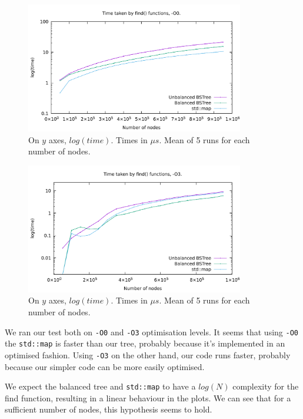 \documentclass[12pt,a4paper,openany]{scrartcl}
\begin{document}
    \begin{figure}[H]
        \centering
        \captionsetup{format=plain}
        \caption{On $y$ axes, $log(time)$. Times in $\mu s$. Mean of 5 runs for each number of nodes.}
        \label{fig:O0}
        \includegraphics[width=0.85\textwidth]{img/plotO0.pdf}
    \end{figure}
    
    \begin{figure}[H]
        \centering
        \captionsetup{format=plain}
        \caption{On $y$ axes, $log(time)$. Times in $\mu s$. Mean of 5 runs for each number of nodes.}
        \label{fig:O3}
        \includegraphics[width=0.85\textwidth]{img/plotO3.pdf}
    \end{figure}
    
    	
	We ran our test both on \texttt{-O0} and \texttt{-O3} optimisation levels. It seems that using \texttt{-O0} the \texttt{std::map} is faster than our tree, probably because it's implemented in an optimised fashion. Using \texttt{-O3} on the other hand, our code runs faster, probably because our simpler code can be more easily optimised.
	
	We expect the balanced tree and \texttt{std::map} to have a $log(N)$ complexity for the find function, resulting in a linear behaviour in the plots. We can see that for a sufficient number of nodes, this hypothesis seems to hold. 
	
\end{document}
